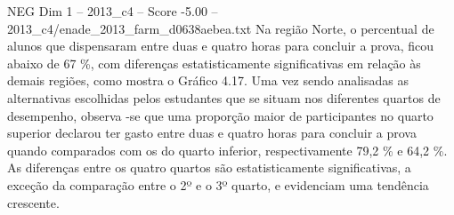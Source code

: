 \begin{textsample}{NEG Dim 1 – 2013\_c4 – Score -5.00 – 2013\_c4/enade\_2013\_farm\_d0638aebea.txt}
Na região Norte, o percentual de alunos que dispensaram entre duas e quatro horas para concluir a prova, ficou abaixo de 67 \%, com diferenças estatisticamente significativas em relação às demais regiões, como mostra o Gráfico 4.17.
Uma vez sendo analisadas as alternativas escolhidas pelos estudantes que se situam nos diferentes quartos de desempenho, observa -se que uma proporção maior de participantes no quarto superior declarou ter gasto entre duas e quatro horas para concluir a prova quando comparados com os do quarto inferior, respectivamente 79,2 \% e 64,2 \%.
As diferenças entre os quatro quartos são estatisticamente significativas, a exceção da comparação entre o 2º e o 3º quarto, e evidenciam uma tendência crescente.

\end{textsample}
